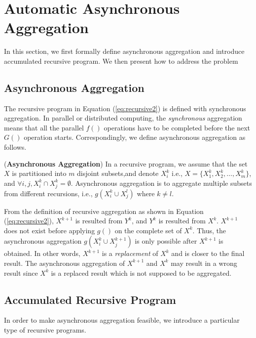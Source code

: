 \section{Automatic Asynchronous Aggregation}
\label{sec:async}
In this section, we first formally define asynchronous aggregation and introduce accumulated recursive program. We then present how to address the problem 

\subsection{Asynchronous Aggregation}
\label{sec:async:async}

The recursive program in Equation (\ref{eq:recursive2}) is defined with synchronous aggregation. In parallel or distributed computing, the \emph{synchronous} aggregation means that all the parallel $f()$ operations have to be completed before the next $G()$ operation starts. %
Correspondingly, we define asynchronous aggregation as follows.

\begin{definition}
	\label{def:asyncaggre}
	(\textbf{Asynchronous Aggregation}) In a recursive program, we assume that the set $X$  is partitioned into $m$ disjoint subsets,and denote $X_i^k$ i.e., $X=\{X_1^k,X_2^k,\ldots,X_m^k\}$, and $\forall i,j, X_i^k\cap X_j^k=\emptyset$. Asynchronous aggregation is to aggregate multiple subsets from different recursions, i.e., $g(X_i^k\cup X_j^{l})$ where $k\neq l$.
\end{definition}

From the definition of recursive aggregation as shown in Equation (\ref{eq:recursive2}), $X^{k+1}$ is resulted from $Y^k$, and $Y^k$ is resulted from $X^k$. $X^{k+1}$ does not exist before applying $g()$ on the complete set of $X^k$. Thus, the asynchronous aggregation $g(X_i^k\cup X_j^{k+1})$ is only possible after $X^{k+1}$ is obtained. In other words, $X^{k+1}$ is a \emph{replacement} of $X^k$ and is closer to the final result. The asynchronous aggregation of $X^{k+1}$ and $X^k$ may result in a wrong result since $X^k$ is a replaced result which is not supposed to be aggregated.

\subsection{Accumulated Recursive Program}
\label{sec:async:accrec}

In order to make asynchronous aggregation feasible, we introduce a particular type of recursive programs.

